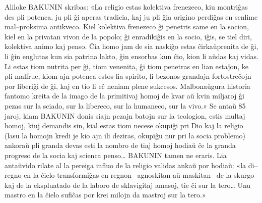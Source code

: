 Aliloke BAKUNIN skribas: «La religio estas kolektiva frenezeco, kiu montriĝas des pli potenca, ju pli ĝi aperas tradicia, kaj ju pli ĝia origino perdiĝas en senlime mal–proksima antikveco. Kiel kolektiva frenezeco ĝi penetris same en la socion, kiel en la privatan vivon de la popolo; ĝi enradikiĝis en la socio, iĝis, se tiel diri, kolektiva animo kaj penso. Ĉia homo jam de sia naskiĝo estas ĉirkaŭprenita de ĝi, li ĝin englutas kun sia patrina lakto, ĝin ensorbas kun ĉio, kion li aŭdas kaj vidas. Li estas tiom nutrita per ĝi, tiom venenita, ĝi tiom penetras en lian estaĵon, ke pli malfrue, kiom ajn potenca estos lia spirito, li bezonos grandajn fortostreĉojn por liberiĝi de ĝi, kaj en tio li eĉ neniam plene sukcesos. Malbonaŭgura historia fantomo kreita de la imago de la primitivaj homoj de kvar aŭ kvin miljaroj ĝi pezas sur la sciado, sur la libereco, sur la humaneco, sur la vivo.» Se antaŭ 85 jaroj, kiam BAKUNIN donis siajn pezajn batojn sur la teologion, estis multaj homoj, kiuj demandis sin, kial estas tiom necese okupiĝi pri Dio kaj la religio (lasu la homojn kredi je kio ajn ili deziras, okupiĝu nur pri la socia problemo) ankoraŭ pli granda devas esti la nombro de tiaj homoj hodiaŭ ĉe la granda progreso de la socia kaj scienca penso… BAKUNIN tamen ne eraris. Lia antaŭvido rilate al la pereiga influo de la religio validas ankaŭ por hodiaŭ: «la di–regno en la ĉielo transformiĝas en regnon –agnoskitan aŭ maskitan– de la skurgo kaj de la ekspluatado de la laboro de sklavigitaj amasoj, tie ĉi sur la tero… Unu mastro en la ĉielo sufiĉas por krei milojn da mastroj sur la tero.»

